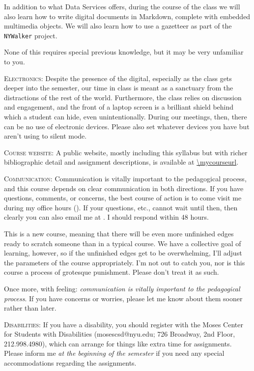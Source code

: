 \begin{description}
    In addition to what Data Services offers, during the course of the class we
    will also learn how to write digital documents in Markdown, complete with
    embedded multimedia objects. We will also learn how to use a gazetteer as
    part of the \texttt{NYWalker} project.

    None of this requires special previous knowledge, but it may be very
    unfamiliar to you.

  \item \textsc{Electronics:} Despite the presence of the digital, especially
    as the class gets deeper into the semester, our time in class is meant as a
    sanctuary from the distractions of the rest of the world. Furthermore, the
    class relies on discussion and engagement, and the front of a laptop screen
    is a brilliant shield behind which a student can hide, even
    unintentionally. During our meetings, then, there can be no use of
    electronic devices. Please also set whatever devices you have but aren’t
    using to silent mode.

  \item \textsc{Course website:} A public website, mostly including this
    syllabus but with richer bibliographic detail and assignment descriptions,
    is available at \url{\mycourseurl}.

  \item \textsc{Communication:} Communication is vitally important to the
    pedagogical process, and this course depends on clear communication in both
    directions. If you have questions, comments, or concerns, the best course
    of action is to come visit me during my office hours (\myofficehours). If
    your questions, etc., cannot wait until then, then clearly you can also
    email me at \texttt{\myemail}. I should respond within 48 hours.

    This is a new course, meaning that there will be even more unfinished edges
    ready to scratch someone than in a typical course. We have a collective
    goal of learning, however, so if the unfinished edges get to be
    overwhelming, I’ll adjust the parameters of the course appropriately. I’m
    not out to catch you, nor is this course a process of grotesque punishment.
    Please don’t treat it as such.

    Once more, with feeling: \textit{communication is vitally important to the
    pedagogical process}. If you have concerns or worries, please let me know
    about them sooner rather than later.

  \item \textsc{Disabilities:} If you have a disability, you should register
    with the Moses Center for Students with Disabilities (mosescsd@nyu.edu; 726
    Broadway, 2nd Floor, 212.998.4980), which can arrange for things like extra
    time for assignments. Please inform me \textit{at the beginning of the
      semester} if you need any special accommodations regarding the
    assignments.


\end{description}
